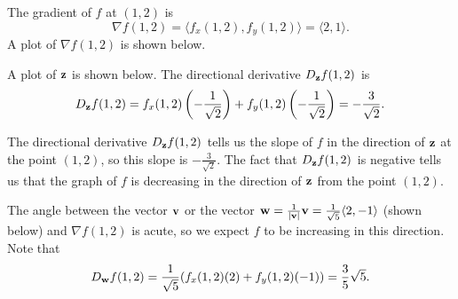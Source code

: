 \begin{activitySolution}
\ba 
\item The gradient of $f$ at $(1,2)$ is
\[\nabla f(1,2) = \langle f_x(1,2), f_y(1,2) \rangle = \langle 2,1\rangle.\]
A plot of  $\nabla f(1,2)$ is shown below.

\item A plot of $\mathbf{z}$ is shown below. The directional derivative $D_{\mathbf{z}}f(1,2)$ is 
\[D_{\mathbf{z}}f(1,2) = f_x(1,2)\left(-\frac{1}{\sqrt{2}}\right) + f_y(1,2)\left(-\frac{1}{\sqrt{2}}\right) = -\frac{3}{\sqrt{2}}.\]

\item The directional derivative $D_{\mathbf{z}}f(1,2)$ tells us the slope of $f$ in the direction of $\mathbf{z}$ at the point $(1,2)$, so this slope is $-\frac{3}{\sqrt{2}}$. The fact that $D_{\mathbf{z}}f(1,2)$ is negative tells us that the graph of $f$ is decreasing in the direction of $\mathbf{z}$ from the point $(1,2)$. 

\item The angle between the vector $\mathbf{v}$ or the vector $\mathbf{w} = \frac{1}{|\mathbf{v}|} \mathbf{v} = \frac{1}{\sqrt{5}}\langle 2, -1 \rangle$ (shown below) and $\nabla f(1,2)$ is acute, so we expect $f$ to be increasing in this direction. Note that 
\[D_{\mathbf{w}}f(1,2) = \frac{1}{\sqrt{5}}(f_x(1,2)(2) + f_y(1,2)(-1)) = \frac{3}{5}\sqrt{5}.\] 

   \begin{center}
    \end{center}
    

\end{activitySolution}
